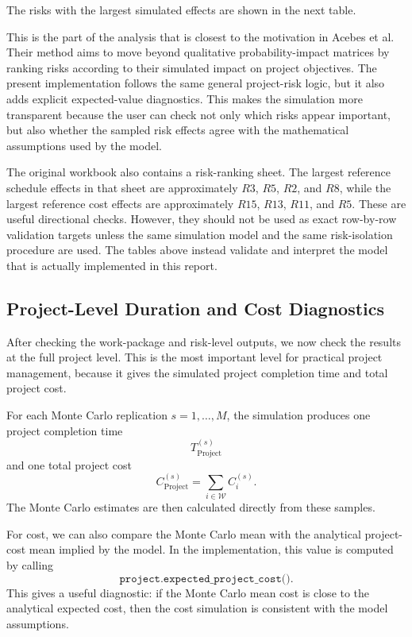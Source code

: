 \documentclass[11pt,a4paper]{article}
\newcommand{\cW}{\mathcal{W}}
\newcommand{\1}{\mathbf{1}}
\theoremstyle{definition}
\theoremstyle{plain}
\theoremstyle{remark}
\numberwithin{equation}{section}
\begin{document}


The risks with the largest simulated effects are shown in the next table.



This is the part of the analysis that is closest to the motivation in Acebes et al. Their method aims to move beyond qualitative probability-impact matrices by ranking risks according to their simulated impact on project objectives. The present implementation follows the same general project-risk logic, but it also adds explicit expected-value diagnostics. This makes the simulation more transparent because the user can check not only which risks appear important, but also whether the sampled risk effects agree with the mathematical assumptions used by the model.

The original workbook also contains a risk-ranking sheet. The largest reference schedule effects in that sheet are approximately $R3$, $R5$, $R2$, and $R8$, while the largest reference cost effects are approximately $R15$, $R13$, $R11$, and $R5$. These are useful directional checks. However, they should not be used as exact row-by-row validation targets unless the same simulation model and the same risk-isolation procedure are used. The tables above instead validate and interpret the model that is actually implemented in this report.

\subsection{Project-Level Duration and Cost Diagnostics}

After checking the work-package and risk-level outputs, we now check the results at the full project level. This is the most important level for practical project management, because it gives the simulated project completion time and total project cost.

For each Monte Carlo replication $s=1,\ldots,M$, the simulation produces one project completion time
\[
T_{\text{Project}}^{(s)}
\]
and one total project cost
\[
C_{\text{Project}}^{(s)}
=
\sum_{i\in\cW}C_i^{(s)}.
\]
The Monte Carlo estimates are then calculated directly from these samples.

For cost, we can also compare the Monte Carlo mean with the analytical project-cost mean implied by the model. In the implementation, this value is computed by calling
\[
\texttt{project.expected\_project\_cost()}.
\]
This gives a useful diagnostic: if the Monte Carlo mean cost is close to the analytical expected cost, then the cost simulation is consistent with the model assumptions.
\end{document}
